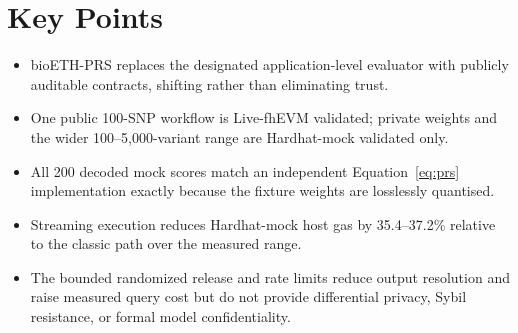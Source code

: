 \documentclass[10pt,twocolumn]{article}
\begin{document}
\begin{abstract}
\noindent
Polygenic risk scores (PRSs) aggregate genetic effect estimates to predict disease
susceptibility, yet clinical deployment often exposes raw genotype data to third-party
compute infrastructure.  Prior homomorphic-encryption approaches still require a
designated evaluator.  We present \textbf{bioETH-PRS}, which replaces that
application-level role with publicly auditable smart contracts on a blockchain supporting
Fully Homomorphic Encryption (fhEVM).  The design minimizes the evaluator role but does
not eliminate trust: confidentiality and correctness remain conditional on the fhEVM coprocessor,
contracts, ACL and threshold-decryption infrastructure, relayer, and chain liveness.
The protocol validates hard-call genotypes and effect-allele orientation before
encryption, converts signed weights to overflow-safe unsigned integers, and supports a
model-fixed bounded randomized categorical release.  One public 100-SNP classic-path
workflow completed on Sepolia in 25 transactions and 20.710271 million gas, with
269,320 ms submission-to-result time, 8,081 ms Gateway/KMS decryption, and encoded score
758,685 matching an independent reference.  Private weights were Hardhat-mock validated
but not executed live.  Across 200 Hardhat-mock jobs at 100--5,000 variants, decoded
scores agreed exactly with the independent implementation because fixture quantisation
was lossless; the streaming path used 35.4--37.2\% less mock host gas than the classic
path.  bioETH-PRS is therefore a bounded-size research prototype for curated additive
models, not a demonstrated genome-wide or clinically deployable PRS engine.
\end{abstract}

\section*{Key Points}
\begin{itemize}
  \item bioETH-PRS replaces the designated application-level evaluator with publicly
        auditable contracts, shifting rather than eliminating trust.
  \item One public 100-SNP workflow is Live-fhEVM validated; private weights and the
        wider 100--5,000-variant range are Hardhat-mock validated only.
  \item All 200 decoded mock scores match an independent Equation~\ref{eq:prs}
        implementation exactly because the fixture weights are losslessly quantised.
  \item Streaming execution reduces Hardhat-mock host gas by 35.4--37.2\% relative to
        the classic path over the measured range.
  \item The bounded randomized release and rate limits reduce output resolution and
        raise measured query cost but do not provide differential privacy, Sybil
        resistance, or formal model confidentiality.
\end{itemize}
\end{document}

